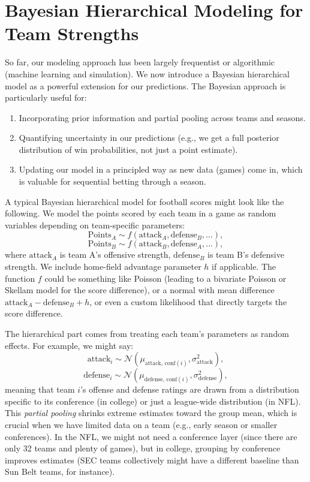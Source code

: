\documentclass[11pt]{amsart}
\begin{document}
\section{Bayesian Hierarchical Modeling for Team Strengths}
So far, our modeling approach has been largely frequentist or algorithmic (machine learning and simulation). We now introduce a Bayesian hierarchical model as a powerful extension for our predictions. The Bayesian approach is particularly useful for:
\begin{enumerate}
    \item Incorporating prior information and partial pooling across teams and seasons.
    \item Quantifying uncertainty in our predictions (e.g., we get a full posterior distribution of win probabilities, not just a point estimate).
    \item Updating our model in a principled way as new data (games) come in, which is valuable for sequential betting through a season.
\end{enumerate}

A typical Bayesian hierarchical model for football scores might look like the following. We model the points scored by each team in a game as random variables depending on team-specific parameters:
\[ \text{Points}_{A} \sim f(\text{attack}_{A}, \text{defense}_{B}, \ldots), \]
\[ \text{Points}_{B} \sim f(\text{attack}_{B}, \text{defense}_{A}, \ldots), \]
where $\text{attack}_A$ is team A’s offensive strength, $\text{defense}_B$ is team B’s defensive strength. We include home-field advantage parameter $h$ if applicable. The function $f$ could be something like Poisson (leading to a bivariate Poisson or Skellam model for the score difference), or a normal with mean difference $\text{attack}_A - \text{defense}_B + h$, or even a custom likelihood that directly targets the score difference.

The hierarchical part comes from treating each team’s parameters as random effects. For example, we might say:
\[ \text{attack}_i \sim \mathcal{N}(\mu_{\text{attack, conf}(i)}, \sigma_{\text{attack}}^2), \]
\[ \text{defense}_i \sim \mathcal{N}(\mu_{\text{defense, conf}(i)}, \sigma_{\text{defense}}^2), \]
meaning that team $i$’s offense and defense ratings are drawn from a distribution specific to its conference (in college) or just a league-wide distribution (in NFL). This \emph{partial pooling} shrinks extreme estimates toward the group mean, which is crucial when we have limited data on a team (e.g., early season or smaller conferences). In the NFL, we might not need a conference layer (since there are only 32 teams and plenty of games), but in college, grouping by conference improves estimates (SEC teams collectively might have a different baseline than Sun Belt teams, for instance).
\end{document}
